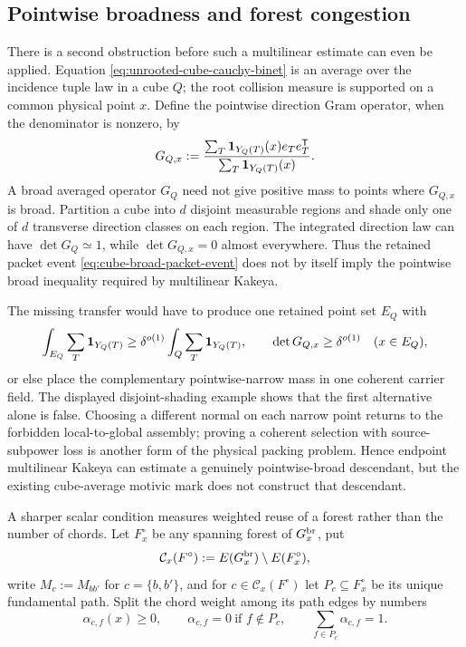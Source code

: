 \documentclass[11pt]{article}
\begin{document}
\subsection{Pointwise broadness and forest congestion}

There is a second obstruction before such a multilinear estimate can even be
applied.  Equation \eqref{eq:unrooted-cube-cauchy-binet} is an average over the
incidence tuple law in a cube \(Q\); the root collision measure is supported on
a common physical point \(x\).  Define the pointwise direction Gram operator,
when the denominator is nonzero, by
\[
 G_{Q,x}:=
 \frac{\sum_T{\bf1}_{Y_Q(T)}(x)e_Te_T^{\mathsf T}}
      {\sum_T{\bf1}_{Y_Q(T)}(x)}.
\]
A broad averaged operator \(G_Q\) need not give positive mass to points where
\(G_{Q,x}\) is broad.  Partition a cube into \(d\) disjoint measurable regions
and shade only one of \(d\) transverse direction classes on each region.  The
integrated direction law can have \(\det G_Q\simeq1\), while
\(\det G_{Q,x}=0\) almost everywhere.  Thus the retained packet event
\eqref{eq:cube-broad-packet-event} does not by itself imply the pointwise
broad inequality required by multilinear Kakeya.

The missing transfer would have to produce one retained point set \(E_Q\) with
\begin{equation}\label{eq:cube-to-point-broad-transfer}
 \int_{E_Q}\sum_T{\bf1}_{Y_Q(T)}
 \ge\delta^{o(1)}\int_Q\sum_T{\bf1}_{Y_Q(T)},
 \qquad
 \det G_{Q,x}\ge\delta^{o(1)}\quad(x\in E_Q),
\end{equation}
or else place the complementary pointwise-narrow mass in one coherent carrier
field.  The displayed disjoint-shading example shows that the first
alternative alone is false.  Choosing a different normal on each narrow point
returns to the forbidden local-to-global assembly; proving a coherent
selection with source-subpower loss is another form of the physical packing
problem.  Hence endpoint multilinear Kakeya can estimate a genuinely
pointwise-broad descendant, but the existing cube-average motivic mark does
not construct that descendant.

A sharper scalar condition measures weighted reuse of a forest rather than
the number of chords.  Let \(F_x^\circ\) be any spanning forest of
\(G_x^{\rm br}\), put
\[
 \mathcal C_x(F^\circ):=E(G_x^{\rm br})\setminus E(F_x^\circ),
\]
write \(M_c:=M_{bb'}\) for \(c=\{b,b'\}\), and for
\(c\in\mathcal C_x(F^\circ)\) let \(P_c\subseteq F_x^\circ\) be its unique
fundamental path.  Split the chord weight among its path edges by numbers
\[
 \alpha_{c,f}(x)\ge0,
 \qquad
 \alpha_{c,f}=0\ \text{if }f\notin P_c,
 \qquad
 \sum_{f\in P_c}\alpha_{c,f}=1.
\]
\end{document}
